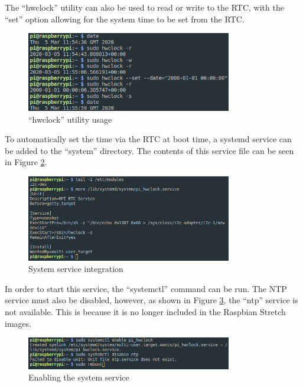 The ``hwclock'' utility can also be used to read or write to the RTC, with the
``set'' option allowing for the system time to be set from the RTC.

\begin{figure}[H]
	\centering
	\includegraphics[width=0.8\textwidth]{images/lkm4}
	\caption{``hwclock'' utility usage}
	\label{fig:images-lkm4}
\end{figure}

To automatically set the time via the RTC at boot time, a systemd service can be
added to the ``system'' directory. The contents of this service file can be seen
in Figure \ref{fig:images-lkm5}.

\begin{figure}[H]
	\centering
	\includegraphics[width=0.8\textwidth]{images/lkm5}
	\caption{System service integration}
	\label{fig:images-lkm5}
\end{figure}

In order to start this service, the ``systemctl'' command can be run. The NTP
service must also be disabled, however, as shown in Figure \ref{fig:images-lkm6}, the
``ntp'' service is not available. This is because it is no longer included in
the Raspbian Stretch images.

\begin{figure}[H]
	\centering
	\includegraphics[width=0.8\textwidth]{images/lkm6}
	\caption{Enabling the system service}
	\label{fig:images-lkm6}
\end{figure}

